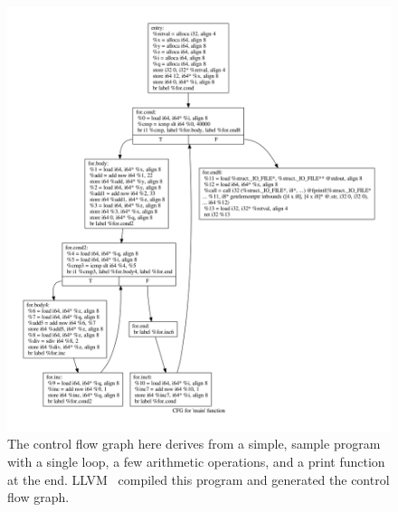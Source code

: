 

\begin{figure}[t]
\centering
\includegraphics[width=.35\textwidth]{simpleO0_cfg-1.jpg}
\caption{The control flow graph here derives from a simple, sample program with a single loop, a few arithmetic operations, and a print function at the end. LLVM~\cite{lattner2004llvm} compiled this program and generated the control flow graph.}
\label{fig:nonobfcfg}
\end{figure}

